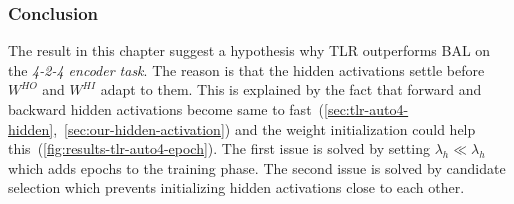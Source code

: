 \subsubsection{Conclusion} 
\label{sec:tlr-auto4-conclusion} 

\label{sec:tlr-auto4-hypothesis} 
The result in this chapter suggest a hypothesis why TLR outperforms BAL on the \emph{4-2-4 encoder task}. The reason is that the hidden activations settle before $W^{HO}$ and $W^{HI}$ adapt to them. This is explained by the fact that forward and backward hidden activations become same to fast~(\ref{sec:tlr-auto4-hidden},~\ref{sec:our-hidden-activation}) and the weight initialization could help this~(\ref{fig:results-tlr-auto4-epoch}). The first issue is solved by setting $\lambda_h \ll \lambda_h$ which adds epochs to the training phase. The second issue is solved by candidate selection which prevents initializing hidden activations close to each other. 


